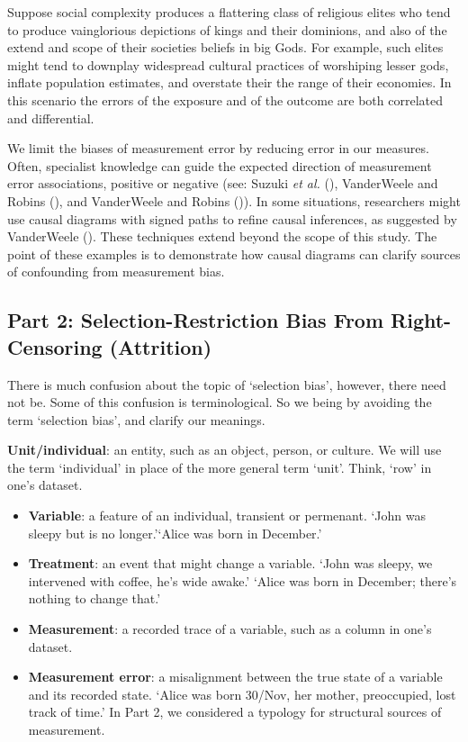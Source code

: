 \documentclass[
  single column]{article}
\begin{document}
Suppose social complexity produces a flattering class of religious
elites who tend to produce vainglorious depictions of kings and their
dominions, and also of the extend and scope of their societies beliefs
in big Gods. For example, such elites might tend to downplay widespread
cultural practices of worshiping lesser gods, inflate population
estimates, and overstate their the range of their economies. In this
scenario the errors of the exposure and of the outcome are both
correlated and differential.

We limit the biases of measurement error by reducing error in our
measures. Often, specialist knowledge can guide the expected direction
of measurement error associations, positive or negative (see: Suzuki
\emph{et al.} (), VanderWeele and Robins
(), and VanderWeele and Robins
()). In some situations,
researchers might use causal diagrams with signed paths to refine causal
inferences, as suggested by VanderWeele
(). These techniques extend beyond
the scope of this study. The point of these examples is to demonstrate
how causal diagrams can clarify sources of confounding from measurement
bias.

\subsection{Part 2: Selection-Restriction Bias From Right-Censoring
(Attrition)}\label{part-2-selection-restriction-bias-from-right-censoring-attrition}

There is much confusion about the topic of `selection bias', however,
there need not be. Some of this confusion is terminological. So we being
by avoiding the term `selection bias', and clarify our meanings.

\textbf{Unit/individual}: an entity, such as an object, person, or
culture. We will use the term `individual' in place of the more general
term `unit'. Think, `row' in one's dataset.

\begin{itemize}
\item
  \textbf{Variable}: a feature of an individual, transient or permenant.
  `John was sleepy but is no longer.'`Alice was born in December.'
\item
  \textbf{Treatment}: an event that might change a variable. `John was
  sleepy, we intervened with coffee, he's wide awake.' `Alice was born
  in December; there's nothing to change that.'
\item
  \textbf{Measurement}: a recorded trace of a variable, such as a column
  in one's dataset.
\item
  \textbf{Measurement error}: a misalignment between the true state of a
  variable and its recorded state. `Alice was born 30/Nov, her mother,
  preoccupied, lost track of time.' In Part 2, we considered a typology
  for structural sources of measurement.
\end{itemize}
\end{document}

